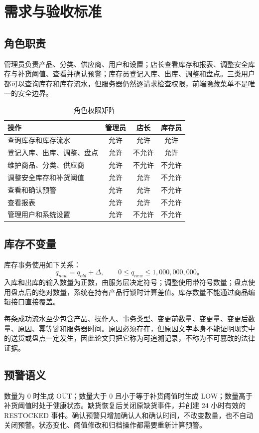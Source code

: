 \documentclass[UTF8,a4paper,11pt]{ctexart}
\begin{document}
\section{需求与验收标准}
\subsection{角色职责}
管理员负责产品、分类、供应商、用户和设置；店长查看库存和报表、调整安全库存与补货阈值、查看并确认预警；库存员登记入库、出库、调整和盘点。三类用户都可以查询库存和库存流水，但服务器仍然逐请求检查权限，前端隐藏菜单不是唯一的安全边界。

\begin{table}[H]\centering\small
\caption{角色权限矩阵}
\begin{tabularx}{\textwidth}{Yccc}\toprule
操作 & 管理员 & 店长 & 库存员\\\midrule
查询库存和库存流水 & 允许 & 允许 & 允许\\
登记入库、出库、调整、盘点 & 允许 & 不允许 & 允许\\
维护商品、分类、供应商 & 允许 & 不允许 & 不允许\\
调整安全库存和补货阈值 & 允许 & 允许 & 不允许\\
查看和确认预警 & 允许 & 允许 & 不允许\\
查看报表 & 允许 & 允许 & 不允许\\
管理用户和系统设置 & 允许 & 不允许 & 不允许\\\bottomrule
\end{tabularx}
\end{table}

\subsection{库存不变量}
库存事务使用如下关系：
\[
q_{new}=q_{old}+\Delta,
\qquad 0\leq q_{new}\leq 1{,}000{,}000{,}000。
\]
入库和出库的输入数量为正数，由服务层决定符号；调整使用带符号数量；盘点使用盘点后的绝对数量，系统在持有产品行锁时计算差值。库存数量不能通过商品编辑接口直接覆盖。

每条成功流水至少包含产品、操作人、事务类型、变更前数量、变更量、变更后数量、原因、幂等键和服务器时间。原因必须存在，但原因文字本身不能证明现实中的送货或盘点一定发生，因此论文只把它称为可追溯记录，不称为不可篡改的法律证据。

\subsection{预警语义}
数量为 0 时生成 OUT；数量大于 0 且小于等于补货阈值时生成 LOW；数量高于补货阈值时处于健康状态。缺货恢复后关闭原缺货事件，并创建 24 小时有效的 RESTOCKED 事件。确认预警只增加确认人和确认时间，不改变数量，也不自动关闭预警。状态变化、阈值修改和归档操作都需要重新计算预警。
\end{document}
